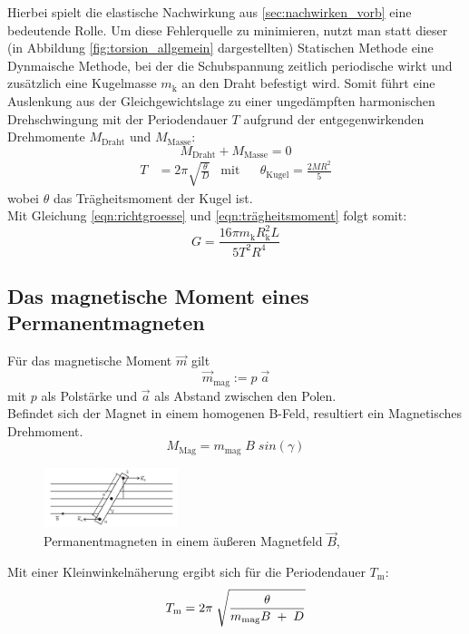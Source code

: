Hierbei spielt die elastische Nachwirkung aus \ref{sec:nachwirken_vorb} eine bedeutende Rolle.
Um diese Fehlerquelle zu minimieren, nutzt man statt dieser (in Abbildung \ref{fig:torsion_allgemein} dargestellten) 
Statischen Methode eine Dynmaische
Methode, bei der die Schubspannung zeitlich periodische wirkt und zusätzlich eine Kugelmasse $m_\text{k}$ 
an den Draht befestigt wird.
\newpage
Somit führt eine Auslenkung aus der Gleichgewichtslage zu einer ungedämpften harmonischen
Drehschwingung mit der Periodendauer $T$ aufgrund der entgegenwirkenden Drehmomente $M_\text{Draht}$ 
und $M_\text{Masse}$:
\begin{equation}
    M_\text{Draht} + M_\text{Masse} = 0
\end{equation}
\begin{align}
    T & = 2\pi \sqrt{\frac{\theta}{D}} & \mathrm{mit} & &  \theta_\text{Kugel} = \frac{2MR^2}{5}
    \label{eqn:trägheitsmoment}
\end{align}
wobei $\theta$ das Trägheitsmoment der Kugel ist.\\

Mit Gleichung \ref{eqn:richtgroesse} und \ref{eqn:trägheitsmoment} folgt somit:
\begin{equation}
    G=\frac{16 \pi m_\text{k}R^2_\text{k}L}{5T^2R^4}
    \label{eqn:schubmodul_formel}
\end{equation}


\subsection{Das magnetische Moment eines Permanentmagneten}
Für das magnetische Moment $\vec{m}$ gilt
\begin{equation}
    \vec{m}_\text{mag}:=p\;\vec{a}
\end{equation}
mit $p$ als Polstärke und $\vec{a}$ als Abstand zwischen den Polen.\\
Befindet sich der Magnet in einem homogenen B-Feld, resultiert ein Magnetisches Drehmoment.
\begin{equation}
    M_\text{Mag} = m_\text{mag}\;B\;sin(\gamma)
\end{equation}

\begin{figure}[h]
    \centering
    \includegraphics[width=0.35\textwidth, height=0.15\textwidth]{bilder/Drehmoment.jpg}
    \caption{Permanentmagneten in einem äußeren Magnetfeld $\vec{B}$,\cite[12]{Anleitung}}        
    \label{fig:drehmoment}
\end{figure}

Mit einer Kleinwinkelnäherung ergibt sich für die Periodendauer $T_\text{m}$:
\begin{equation}
    T_\text{m} = 2\pi\;\sqrt{\frac{\theta}{m_\text{mag}B\;+\;D}}\\
    \label{eqn:periode}
\end{equation}


